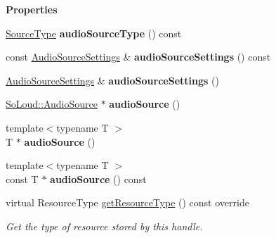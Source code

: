 \begin{Indent}\textbf{ Properties}\par
\begin{DoxyCompactItemize}
\item 
\mbox{\label{classrev_1_1_audio_resource_a9c95a725ffbd8b8073ae23242020e556}} 
\mbox{\hyperlink{classrev_1_1_audio_resource_a0793d33db36716e1ba7b283b6ded8707}{Source\+Type}} {\bfseries audio\+Source\+Type} () const
\item 
\mbox{\label{classrev_1_1_audio_resource_a1501818117de2ede7349b7bfd9557da3}} 
const \mbox{\hyperlink{structrev_1_1_audio_source_settings}{Audio\+Source\+Settings}} \& {\bfseries audio\+Source\+Settings} () const
\item 
\mbox{\label{classrev_1_1_audio_resource_afe186fbaa2cb356aa2a7177c4b427c74}} 
\mbox{\hyperlink{structrev_1_1_audio_source_settings}{Audio\+Source\+Settings}} \& {\bfseries audio\+Source\+Settings} ()
\item 
\mbox{\label{classrev_1_1_audio_resource_ad1766aa979ad2e58dede76e934cdca42}} 
\mbox{\hyperlink{class_so_loud_1_1_audio_source}{So\+Loud\+::\+Audio\+Source}} $\ast$ {\bfseries audio\+Source} ()
\item 
\mbox{\label{classrev_1_1_audio_resource_ae8aa797d001cba07c80091a7b8fec50f}} 
{\footnotesize template$<$typename T $>$ }\\T $\ast$ {\bfseries audio\+Source} ()
\item 
\mbox{\label{classrev_1_1_audio_resource_ace54bc805789fee3e68cf0aa6a0fe202}} 
{\footnotesize template$<$typename T $>$ }\\const T $\ast$ {\bfseries audio\+Source} () const
\item 
\mbox{\label{classrev_1_1_audio_resource_abd008b2ca74de6b57d8a6802c8bbf7c6}} 
virtual Resource\+Type \mbox{\hyperlink{classrev_1_1_audio_resource_abd008b2ca74de6b57d8a6802c8bbf7c6}{get\+Resource\+Type}} () const override
\begin{DoxyCompactList}\small\item\em Get the type of resource stored by this handle. \end{DoxyCompactList}\end{DoxyCompactItemize}
\end{Indent}

